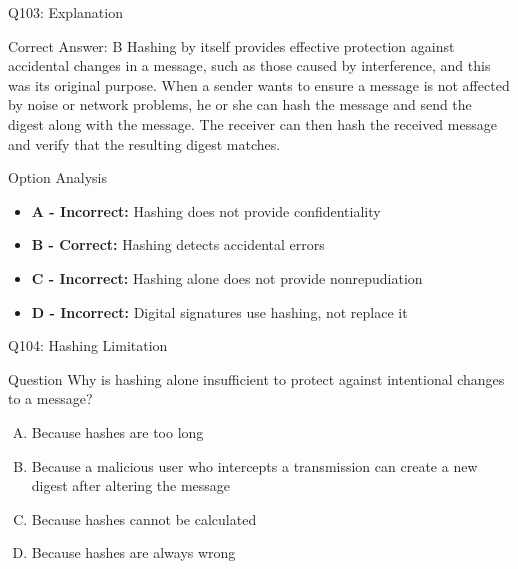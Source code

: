 \documentclass{beamer}
\begin{document}
	\begin{frame}{Q103: Explanation}
		\begin{block}{Correct Answer: B}
			Hashing by itself provides effective protection against accidental changes in a message, such as those caused by interference, and this was its original purpose. When a sender wants to ensure a message is not affected by noise or network problems, he or she can hash the message and send the digest along with the message. The receiver can then hash the received message and verify that the resulting digest matches.
		\end{block}
		\begin{block}{Option Analysis}
			\begin{itemize}
				\item \textbf{A - Incorrect:} Hashing does not provide confidentiality
				\item \textbf{B - Correct:} Hashing detects accidental errors
				\item \textbf{C - Incorrect:} Hashing alone does not provide nonrepudiation
				\item \textbf{D - Incorrect:} Digital signatures use hashing, not replace it
			\end{itemize}
		\end{block}
	\end{frame}
	
	\begin{frame}{Q104: Hashing Limitation}
		\begin{block}{Question}
			Why is hashing alone insufficient to protect against intentional changes to a message?
		\end{block}
		\begin{enumerate}[(A)]
			\item Because hashes are too long
			\item Because a malicious user who intercepts a transmission can create a new digest after altering the message
			\item Because hashes cannot be calculated
			\item Because hashes are always wrong
		\end{enumerate}
	\end{frame}
	
\end{document}
